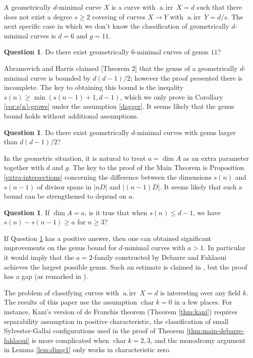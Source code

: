 \documentclass[11pt]{amsart}
\DeclareMathOperator{\Char}{char}
\newcommand{\gairr}{\overline{\operatorname{a.\!irr}}\ }
\theoremstyle{definition}
\newtheorem{question}[theorem]{Question}
\theoremstyle{remark}
\begin{document}
\medskip

A geometrically \(d\)-minimal curve $X$ is a curve with $\gairr X = d$ such that there does not exist a degree $s \geqslant 2$ covering of curves $X \to Y$ with $\gairr Y = d/s$. 
The next specific case in which we don't know the classification of geometrically \(d\)-minimal curves is \(d=6\) and \(g=11\).  
\begin{question}
Do there exist geometrically \(6\)-minimal curves of genus \(11\)?
\end{question}
Abramovich and Harris claimed \cite{Abramovich-Harris1991}[Theorem 2] that the genus of a geometrically $d$-minimal curve is bounded by $d(d-1)/2$; however the proof presented there is incomplete. The key to obtaining this bound is the ineqality $s(n) \geqslant \min(s(n-1)+1, d-1)$, which we only prove in Corollary \ref{cor:s(n)-grows} under the assumption \eqref{dagger}. It seems likely that the genus bound holds without additional assumptions.

\begin{question}\label{que:no-daggers}
Do there exist geometrically $d$-minimal curves with genus larger than $d(d-1)/2$?
\end{question}


In the geometric situation, it is natural to treat $a=\dim A$ as an extra parameter together with \(d\) and \(g\). The key to the proof of the Main Theorem is Proposition \ref{extra-intersections} concerning the difference between the dimensions \(s(n)\) and \(s(n-1)\) of divisor spans in \(|nD|\) and \(|(n-1)D|\). It seems likely that such a bound can be strengthened to depend on $a$.

\begin{question}\label{que:geometric-dim-A}
If \(\dim A  = a\), is it true that when \(s(n) \leqslant d-1\), we have
\(s(n) - s(n-1) \geqslant a\) for \(n \geqslant 3\)?
\end{question}

If Question \ref{que:geometric-dim-A} has a positive answer, then one can obtained significant improvements on the genus bound for $d$-minimal curves with $a>1$. In particular it would imply that the $a=2$-family constructed by Debarre and Fahlaoui \cite{Debarre-Fahlaoui1993} achieves the largest possible genus. Such an estimate is claimed in \cite{Abramovich-Harris1991}, but the proof has a gap (as remarked in \cite{Debarre-Fahlaoui1993}).

\medskip

The problem of classifying curves with $\gairr X = d$ is interesting over any field $k$. The results of this paper use the assumption $\Char k = 0$ in a few places. For instance, Kani's version of de Franchis theorem (Theorem \ref{thm:kani}) requires separability assumption in positive characteristic, the classification of small Sylvester-Gallai configurations used in the proof of Theorem \ref{thm:main-debarre-fahlaoui} is more complicated when $\Char k = 2,3$, and the monodromy argument in Lemma \ref{lem:dimg1} only works in characteristic zero. 
\end{document}
